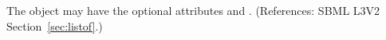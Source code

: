 The  object may have the optional attributes   and
. (References: SBML L3V2 Section~\ref{sec:listof}.)
